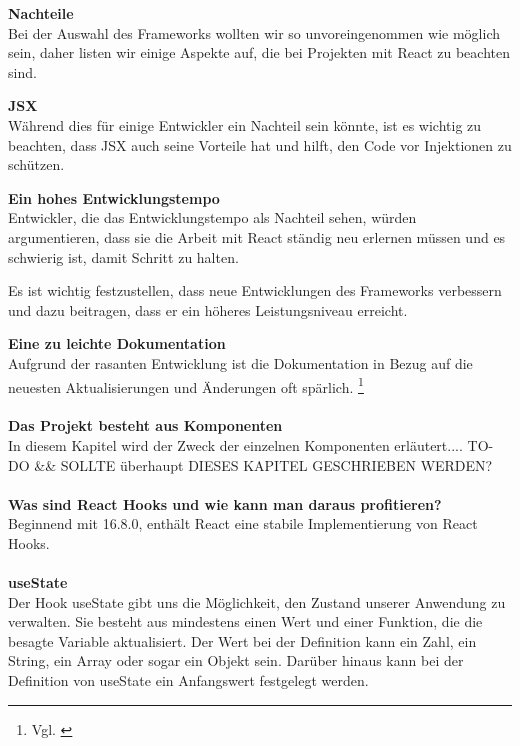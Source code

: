 \textbf{Nachteile}\\
Bei der Auswahl des Frameworks wollten wir so unvoreingenommen wie möglich sein, daher listen wir einige Aspekte auf, die bei Projekten mit React zu beachten sind.
\newline

\textbf{JSX}\\
Während dies für einige Entwickler ein Nachteil sein könnte, ist es wichtig zu beachten, dass JSX auch seine Vorteile hat und hilft, den Code vor Injektionen zu schützen.
\newline

\newpage
\textbf{Ein hohes Entwicklungstempo}\\
Entwickler, die das Entwicklungstempo als Nachteil sehen, würden argumentieren, dass sie die Arbeit mit React ständig neu erlernen müssen und es schwierig ist, damit Schritt zu halten.

Es ist wichtig festzustellen, dass neue Entwicklungen des Frameworks verbessern und dazu beitragen, dass er ein höheres Leistungsniveau erreicht. 
\newline

\textbf{Eine zu leichte Dokumentation}\\
Aufgrund der rasanten Entwicklung ist die Dokumentation in Bezug auf die neuesten Aktualisierungen und Änderungen oft spärlich. 
\footnote{ Vgl. \cite{R01}}

\paragraph{}
\textbf{Das Projekt besteht aus Komponenten}\\
In diesem Kapitel wird der Zweck der einzelnen Komponenten erläutert....
TO-DO && SOLLTE überhaupt DIESES KAPITEL GESCHRIEBEN WERDEN?


\paragraph{}
\textbf{Was sind React Hooks und wie kann man daraus profitieren?}\\Beginnend mit 16.8.0, enthält React eine stabile Implementierung von React Hooks.

\paragraph{}
\textbf{useState}\\
Der Hook useState gibt uns die Möglichkeit, den Zustand unserer Anwendung zu verwalten. Sie besteht aus mindestens einen Wert und einer Funktion, die die besagte Variable aktualisiert.
Der Wert bei der Definition kann ein Zahl, ein String, ein Array oder sogar ein Objekt sein.
Darüber hinaus kann bei der Definition von useState ein Anfangswert festgelegt werden.


